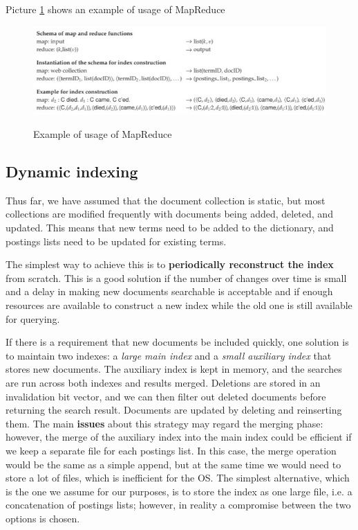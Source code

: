 Picture \ref{map reduce example} shows an example of usage of MapReduce

\begin{figure}[h!]
		\centering
		\includegraphics[scale = 1.5]{img/map reduce example.jpg}
		\label{map reduce example}
        \caption{Example of usage of MapReduce}
\end{figure}

\subsection{Dynamic indexing}
Thus far, we have assumed that the document collection is static, but most collections are modified frequently with documents being added, deleted, and updated. This means that new terms need to be added to the dictionary, and postings lists need to be updated for existing terms.

The simplest way to achieve this is to \textbf{periodically reconstruct the index} from scratch. This is a good solution if the number of changes over time is small and a delay in making new documents searchable is acceptable and if enough resources are available to construct a new index while the old one is still available for querying.

If there is a requirement that new documents be included quickly, one solution is to maintain two indexes: a \textit{large main index} and a \textit{small auxiliary index} that stores new documents. The auxiliary index is kept in memory, and the searches are run across both indexes and results merged. Deletions are stored in an invalidation bit vector, and we can then filter out deleted documents before returning the search result. Documents are updated by deleting and reinserting them. The main \textbf{issues} about this strategy may regard the merging phase: however, the merge of the auxiliary index into the main index could be efficient if we keep a separate file for each postings list. In this case, the merge operation would be the same as a simple append, but at the same time we would need to store a lot of files, which is inefficient for the OS. The simplest alternative, which is the one we assume for our purposes, is to store the index as one large file, i.e. a concatenation of postings lists; however, in reality a compromise between the two options is chosen.

